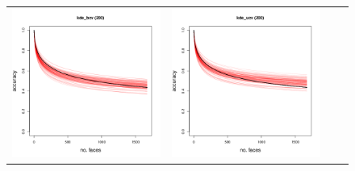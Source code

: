 \documentclass[twoside,11pt]{article}
\begin{document}
\begin{figure}[t]
\begin{tabular}{cccc}
\includegraphics[scale = 0.2, clip = true, trim = 0 0 0 0.6in, valign=c]{repeat_200_kde_bcv.png} &
\includegraphics[scale = 0.2, clip = true, trim = 0 0 0 0.6in, valign=c]{repeat_200_kde_ucv.png} \\

\end{tabular}
\end{figure}
\end{document}
